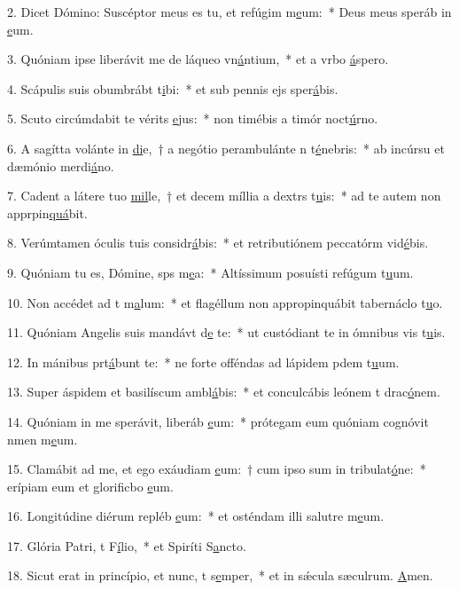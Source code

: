 2. Dicet Dómino: Suscéptor meus es tu, et refúgim m\uline{e}um:~* Deus meus speráb in \uline{e}um.\par 
3. Quóniam ipse liberávit me de láqueo vn\uline{á}ntium,~* et a vrbo \uline{á}spero.\par 
4. Scápulis suis obumbrábt t\uline{i}bi:~* et sub pennis ejs sper\uline{á}bis.\par 
5. Scuto circúmdabit te vérits \uline{e}jus:~* non timébis a timór noct\uline{ú}rno.\par 
6. A sagítta volánte in \uline{di}e,~† a negótio perambulánte n t\uline{é}nebris:~* ab incúrsu et dæmónio merdi\uline{á}no.\par 
7. Cadent a látere tuo \uline{mil}le,~† et decem míllia a dextrs t\uline{u}is:~* ad te autem non apprpin\uline{quá}bit.\par 
8. Verúmtamen óculis tuis considr\uline{á}bis:~* et retributiónem peccatórm vid\uline{é}bis.\par 
9. Quóniam tu es, Dómine, sps m\uline{e}a:~* Altíssimum posuísti refúgum t\uline{u}um.\par 
10. Non accédet ad t m\uline{a}lum:~* et flagéllum non appropinquábit tabernáclo t\uline{u}o.\par 
11. Quóniam Angelis suis mandávt d\uline{e} te:~* ut custódiant te in ómnibus vis t\uline{u}is.\par 
12. In mánibus prt\uline{á}bunt te:~* ne forte offéndas ad lápidem pdem t\uline{u}um.\par 
13. Super áspidem et basilíscum ambl\uline{á}bis:~* et conculcábis leónem t drac\uline{ó}nem.\par 
14. Quóniam in me sperávit, liberáb \uline{e}um:~* prótegam eum quóniam cognóvit nmen m\uline{e}um.\par 
15. Clamábit ad me, et ego exáudiam \uline{e}um:~† cum ipso sum in tribulat\uline{ó}ne:~* erípiam eum et glorificbo \uline{e}um.\par 
16. Longitúdine diérum repléb \uline{e}um:~* et osténdam illi salutre m\uline{e}um.\par 
17. Glória Patri, t F\uline{í}lio,~* et Spiríti S\uline{a}ncto.\par 
18. Sicut erat in princípio, et nunc, t s\uline{e}mper,~* et in sǽcula sæculrum. \uline{A}men.\par 
